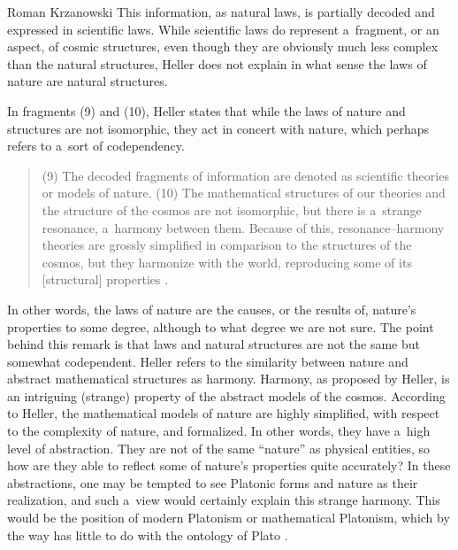 \begin{artengenv}{Roman Krzanowski}
This information, as natural laws, is partially decoded and expressed in scientific laws. While scientific laws do represent a~fragment, or an aspect, of cosmic structures, even though they are obviously much less complex than the natural structures, Heller does not explain in what sense the laws of nature are natural structures.



In fragments (9) and (10), Heller states that while the laws of nature and structures are not isomorphic, they act in concert with nature, which perhaps refers to a~sort of codependency.



\begin{quote}
(9) The decoded fragments of information are denoted as scientific theories or models of nature. (10) The mathematical structures of our theories and the structure of the cosmos are not isomorphic, but there is a~strange resonance, a~harmony between them. Because of this, resonance–harmony theories are grossly simplified in comparison to the structures of the cosmos, but they harmonize with the world, reproducing some of its [structural] properties 
\parencite[][p.170]{heller_nauka_1995}.%
\end{quote}




In other words, the laws of nature are the causes, or the results of, nature's properties to some degree, although to what degree we are not sure. The point behind this remark is that laws and natural structures are not the same but somewhat codependent. Heller refers to the similarity between nature and abstract mathematical structures as harmony. Harmony, as proposed by Heller, is an intriguing (strange) property of the abstract models of the cosmos. According to Heller, the mathematical models of nature are highly simplified, with respect to the complexity of nature, and formalized. In other words, they have a~high level of abstraction. They are not of the same ``nature'' as physical entities, so how are they able to reflect some of nature's properties quite accurately? In these abstractions, one may be tempted to see Platonic forms and nature as their realization, and such a~view would certainly explain this strange harmony. This would be the position of modern Platonism or mathematical Platonism, which by the way has little to do with the ontology of Plato 
\parencite[e.g.,][]{linnebo_platonism_2018}.%





\end{artengenv}
